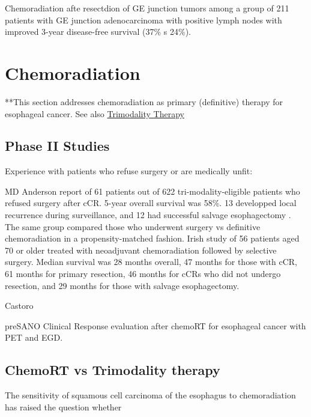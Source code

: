 \documentclass[
]{book}
\begin{document}
Chemoradiation afte resectdion of GE junction tumors \citep{kofoed26} among a group of 211 patients with GE junction adenocarcinoma with positive lymph nodes with improved 3-year disease-free survival (37\% s 24\%).

\hypertarget{eso_dcrt}{%
\chapter{Chemoradiation}\label{eso_dcrt}}

**This section addresses chemoradiation as primary (definitive) therapy for esophageal cancer. See also \protect\hyperlink{trimodality}{Trimodality Therapy}

\hypertarget{phase-ii-studies}{%
\section{Phase II Studies}\label{phase-ii-studies}}

Experience with patients who refuse surgery or are medically unfit:

MD Anderson report of 61 patients out of 622 tri-modality-eligible patients who refused surgery after cCR. 5-year overall survival was 58\%. 13 developped local recurrence during surveillance, and 12 had successful salvage esophagectomy \citep{taketa300}. The same group compared those who underwent surgery vs definitive chemoradiation in a propensity-matched fashion\citep{taketa95}. Irish study of 56 patients aged 70 or older treated with neoadjuvant chemoradiation followed by selective surgery. Median survival was 28 months overall, 47 months for those with cCR, 61 months for primary resection, 46 months for cCRs who did not undergo resection, and 29 months for those with salvage esophagectomy\citep{furlong107}.

Castoro\citep{castoro1375}

preSANO\citep{chirieac1347} Clinical Response evaluation after chemoRT for esophageal cancer with PET and EGD.

\hypertarget{chemort-vs-trimodality-therapy}{%
\section{ChemoRT vs Trimodality therapy}\label{chemort-vs-trimodality-therapy}}

The sensitivity of squamous cell carcinoma of the esophagus to chemoradiation has raised the question whether
\end{document}
